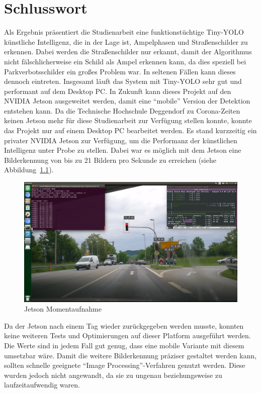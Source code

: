 \documentclass[a4paper,oneside,12pt]{report}
\begin{document}
	\chapter{Schlusswort}
	\begin{onehalfspace}
		Als Ergebnis präsentiert die Studienarbeit eine funktionstüchtige Tiny-YOLO künstliche Intelligenz, die in der Lage ist, Ampelphasen und Straßenschilder zu erkennen. Dabei werden die Straßenschilder nur erkannt, damit der Algorithmus nicht fälschlicherweise ein Schild als Ampel erkennen kann, da dies speziell bei Parkverbotsschilder ein großes Problem war. In seltenen Fällen kann dieses dennoch eintreten. Insgesamt läuft das System mit Tiny-YOLO sehr gut und performant auf dem Desktop PC. In Zukunft kann dieses Projekt auf den NVIDIA Jetson ausgeweitet werden, damit eine "`mobile"' Version der Detektion entstehen kann. Da die Technische Hochschule Deggendorf zu Corona-Zeiten keinen Jetson mehr für diese Studienarbeit zur Verfügung stellen konnte, konnte das Projekt nur auf einem Desktop PC bearbeitet werden. Es stand kurzzeitig ein privater NVIDIA Jetson zur Verfügung, um die Performanz der künstlichen Intelligenz unter Probe zu stellen. Dabei war es möglich mit dem Jetson eine Bilderkennung von bis zu 21 Bildern pro Sekunde zu erreichen (siehe Abbildung~\ref{fig:Jetson}).
		\begin{figure}[h!]
			\includegraphics[width=\linewidth]{Jetson.png}
			\caption{Jetson Momentaufnahme}
			\label{fig:Jetson}
		\end{figure}
		Da der Jetson nach einem Tag wieder zurückgegeben werden musste, konnten keine weiteren Tests und Optimierungen auf dieser Platform ausgeführt werden. Die Werte sind in jedem Fall gut genug, dass eine mobile Variante mit diesem umsetzbar wäre. Damit die weitere Bilderkennung präziser gestaltet werden kann, sollten schnelle geeignete "`Image Processing"'-Verfahren genutzt werden. Diese wurden jedoch nicht angewandt, da sie zu ungenau beziehungsweise zu laufzeitaufwendig waren.
	\end{onehalfspace}
	
\end{document}
